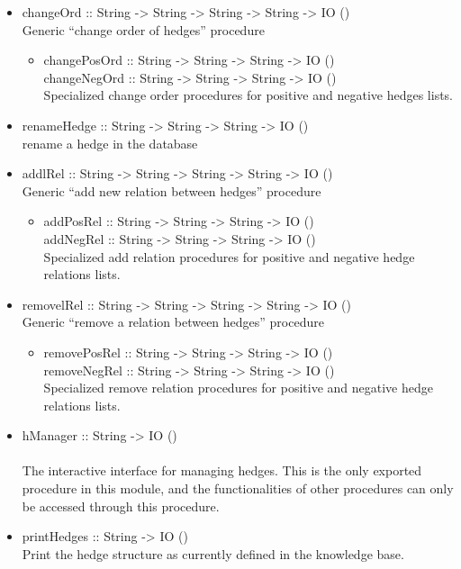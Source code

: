 \documentclass[../gr-final.tex]{subfiles}
\begin{document}
\begin{itemize}
      \item changeOrd :: String -> String -> String -> String -> IO ()
              \\Generic ``change order of hedges'' procedure
      \begin{itemize}
      \item changePosOrd :: String -> String -> String -> IO ()
         \\ changeNegOrd :: String -> String -> String -> IO ()
         \\ Specialized change order procedures for positive and negative
         hedges lists.
      \end{itemize}

      \item renameHedge :: String -> String -> String -> IO ()
       \\ rename a hedge in the database

      \item addlRel :: String -> String -> String -> String -> IO ()
              \\ Generic ``add new relation between hedges''
              procedure
      \begin{itemize}
      \item addPosRel :: String -> String -> String -> IO ()
          \\ addNegRel :: String -> String -> String -> IO ()
         \\ Specialized add relation procedures for positive and negative
         hedge relations lists.
      \end{itemize}

      \item removelRel :: String -> String -> String -> String -> IO ()
              \\ Generic ``remove a relation between hedges''
              procedure
      \begin{itemize}
      \item removePosRel :: String -> String -> String -> IO ()
        \\  removeNegRel :: String -> String -> String -> IO ()
         \\ Specialized remove relation procedures for positive and negative
         hedge relations lists.
      \end{itemize}

      \item hManager :: String -> IO ()\\
              \\ The interactive interface for managing hedges.
              This is the only exported procedure in this module,
              and the functionalities of other procedures can
              only be accessed through this procedure.
      \item printHedges :: String -> IO ()\\
              Print the hedge structure as currently defined in the
              knowledge base.
\end{itemize}
\end{document}
